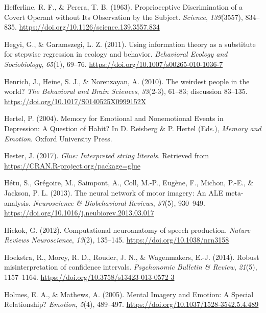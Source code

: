 \documentclass[a4paper,12pt,twoside,openright,oldfontcommands,final]{memoir}
\begin{document}
\leavevmode\hypertarget{ref-hefferline_proprioceptive_1963}{}%
Hefferline, R. F., \& Perera, T. B. (1963). Proprioceptive Discrimination of a Covert Operant without Its Observation by the Subject. \emph{Science}, \emph{139}(3557), 834--835. \url{https://doi.org/10.1126/science.139.3557.834}

\leavevmode\hypertarget{ref-hegyi_using_2011}{}%
Hegyi, G., \& Garamszegi, L. Z. (2011). Using information theory as a substitute for stepwise regression in ecology and behavior. \emph{Behavioral Ecology and Sociobiology}, \emph{65}(1), 69--76. \url{https://doi.org/10.1007/s00265-010-1036-7}

\leavevmode\hypertarget{ref-henrich_weirdest_2010}{}%
Henrich, J., Heine, S. J., \& Norenzayan, A. (2010). The weirdest people in the world? \emph{The Behavioral and Brain Sciences}, \emph{33}(2-3), 61--83; discussion 83--135. \url{https://doi.org/10.1017/S0140525X0999152X}

\leavevmode\hypertarget{ref-hertel_memory_2004}{}%
Hertel, P. (2004). Memory for Emotional and Nonemotional Events in Depression: A Question of Habit? In D. Reisberg \& P. Hertel (Eds.), \emph{Memory and Emotion}. Oxford University Press.

\leavevmode\hypertarget{ref-R-glue}{}%
Hester, J. (2017). \emph{Glue: Interpreted string literals}. Retrieved from \url{https://CRAN.R-project.org/package=glue}

\leavevmode\hypertarget{ref-hetu_neural_2013}{}%
Hétu, S., Grégoire, M., Saimpont, A., Coll, M.-P., Eugène, F., Michon, P.-E., \& Jackson, P. L. (2013). The neural network of motor imagery: An ALE meta-analysis. \emph{Neuroscience \& Biobehavioral Reviews}, \emph{37}(5), 930--949. \url{https://doi.org/10.1016/j.neubiorev.2013.03.017}

\leavevmode\hypertarget{ref-hickok_computational_2012}{}%
Hickok, G. (2012). Computational neuroanatomy of speech production. \emph{Nature Reviews Neuroscience}, \emph{13}(2), 135--145. \url{https://doi.org/10.1038/nrn3158}

\leavevmode\hypertarget{ref-Hoekstra2014}{}%
Hoekstra, R., Morey, R. D., Rouder, J. N., \& Wagenmakers, E.-J. (2014). Robust misinterpretation of confidence intervals. \emph{Psychonomic Bulletin \& Review}, \emph{21}(5), 1157--1164. \url{https://doi.org/10.3758/s13423-013-0572-3}

\leavevmode\hypertarget{ref-holmes_mental_2005}{}%
Holmes, E. A., \& Mathews, A. (2005). Mental Imagery and Emotion: A Special Relationship? \emph{Emotion}, \emph{5}(4), 489--497. \url{https://doi.org/10.1037/1528-3542.5.4.489}
\end{document}
